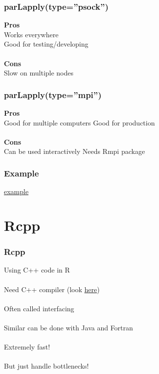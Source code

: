 \documentclass{beamer}
\begin{document}
\begin{frame}
	\frametitle{parLapply(type=''psock'')}
	\begin{center}
		\textbf{Pros} \\
		Works everywhere \\
		Good for testing/developing \\~\\
		
		\textbf{Cons} \\
		Slow on multiple nodes
	\end{center}
\end{frame}

\begin{frame}
	\frametitle{parLapply(type=''mpi'')}
	\begin{center}
		\textbf{Pros} \\
		Good for multiple computers
		Good for production \\~\\
		
		\textbf{Cons} \\
		Can be used interactively
		Needs Rmpi package
	\end{center}
\end{frame}

\begin{frame}
	\frametitle{Example}
	\begin{center}
		\href{https://github.com/MansMeg/AdvRCourse/blob/master/Code/parallel_example.R}{example}
	\end{center}
\end{frame}

\section{Rcpp}

\begin{frame}
	\frametitle{Rcpp}
	\begin{center}
		Using C++ code in R \\~\\
		Need C++ compiler (look \href{http://adv-r.had.co.nz/Rcpp.html}{here}) 
		\\~\\
		Often called interfacing \\~\\
		Similar can be done with Java and Fortran \\~\\
		Extremely fast! \\~\\
		But just handle bottlenecks! \\~\\
	\end{center}
\end{frame}
\end{document}
